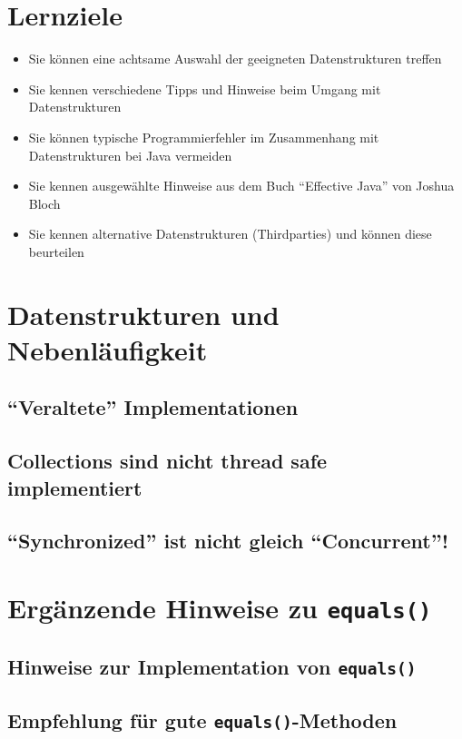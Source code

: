 \section{Lernziele}
\begin{itemize}[noitemsep,topsep=0pt,leftmargin=*]
    \item Sie können eine achtsame Auswahl der geeigneten Datenstrukturen treffen
    \item Sie kennen verschiedene Tipps und Hinweise beim Umgang mit Datenstrukturen
    \item Sie können typische Programmierfehler im Zusammenhang mit Datenstrukturen bei Java vermeiden
    \item Sie kennen ausgewählte Hinweise aus dem Buch "`Effective Java"' von Joshua Bloch
    \item Sie kennen alternative Datenstrukturen (Thirdparties) und können diese beurteilen
\end{itemize}

\section{Datenstrukturen und Nebenläufigkeit}
\subsection{"`Veraltete"' Implementationen}
\subsection{Collections sind nicht thread safe implementiert}
\subsection{"`Synchronized"' ist nicht gleich "`Concurrent"'!}

\section{Ergänzende Hinweise zu \texttt{equals()}}
\subsection{Hinweise zur Implementation von \texttt{equals()}}
\subsection{Empfehlung für gute \texttt{equals()}-Methoden}

